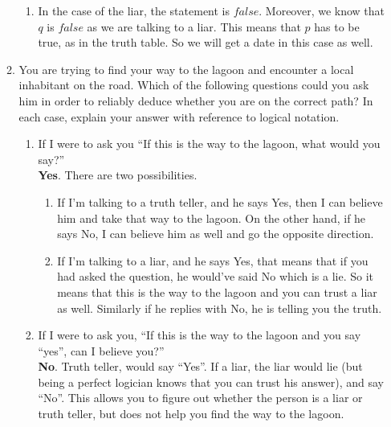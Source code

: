 \documentclass[11pt]{article}
\begin{document}
\begin{enumerate}
\begin{enumerate}
\begin{enumerate}
				\item In the case of the liar, the statement is $false$. Moreover, we know that $q$ is $false$ as we are talking to a liar. This means that $p$ has to be true, as in the truth table. So we will get a date in this case as well.  
				
			\end{enumerate} 
			
			\item You are trying to find your way to the lagoon and encounter a local inhabitant on the road. Which of
			the following questions could you ask him in order to reliably deduce whether you are on the correct
			path? In each case, explain your answer with reference to logical notation.\\
			
			\begin{enumerate} 
				
				
				\item If I were to ask you ``If this is the way to the lagoon, what would you say?”\\ 
				
				\textbf{Yes}. There are two possibilities.  
				\begin{enumerate}
					\item If I'm talking to a truth teller, and he says Yes, then I can believe him and take that way to the lagoon. On the other hand, if he says No, I can believe him as well and go the opposite direction. 
					
					\item If I'm talking to a liar, and he says Yes, that means that if you had asked the question, he would've said No which is a lie. So it means that this is the way to the lagoon and you can trust a liar as well. Similarly if he replies with No, he is telling you the truth.  
				\end{enumerate}

				\item If I were to ask you, “If this is the way to the lagoon and you say “yes”, can I believe you?”\\
				\textbf{No}. Truth teller, would say “Yes”. If a liar, the liar would lie (but being a perfect logician knows that you can trust his answer), and say “No”. This allows you to figure out whether the person is a liar or truth teller, but does not help you find the way to the lagoon.\\
				

\end{enumerate}
\end{enumerate}
\end{enumerate}
\end{document}
